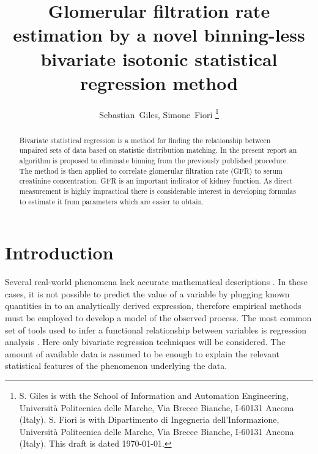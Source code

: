 \documentclass[10pt,final]{siamltex}
\begin{document}
\title{Glomerular filtration rate estimation by a novel binning-less bivariate isotonic statistical regression method}
\author{Sebastian~Giles, Simone~Fiori%
\thanks{S. Giles is with the School of Information and Automation Engineering,
Universit\`{a} Politecnica delle Marche,
Via Brecce Bianche, I-60131 Ancona (Italy).
\newline\indent
S. Fiori is with Dipartimento di Ingegneria dell'Informazione,
Universit\`{a} Politecnica delle Marche,
Via Brecce Bianche, I-60131 Ancona (Italy).
\newline\indent
This draft is dated \today.}}
\maketitle
\def\bbbr{\mathbb{R}}
\def\bbbx{\mathbb{X}}
\def\bbby{\mathbb{Y}}
\def\mdef{{\stackrel{{\mathrm{def}}}{=}}}
\renewcommand*{\thefootnote}{\fnsymbol{footnote}}
\def\to{\mathbf{\ to\ }}
\setcounter{footnote}{1}
%
%
\begin{abstract}
  Bivariate statistical regression is a method for finding the relationship between unpaired sets of data based on statistic distribution matching. In the present report an  algorithm is proposed to eliminate binning from the previously published procedure. The method is then applied to correlate glomerular filtration rate (GFR) to serum creatinine concentration. GFR is an important indicator of kidney function. As direct measurement is highly impractical there is considerable interest in developing formulas to estimate it from parameters which are easier to obtain.
\end{abstract}
%
\section{Introduction}\label{intro}
Several real-world phenomena lack accurate mathematical descriptions \cite{strontium, seismic}. In these cases, it is not possible to predict the value of a variable by plugging known quantities in to an analytically derived expression, therefore empirical methods must be employed to develop a model of the observed process. The most common set of tools used to infer a functional relationship between variables is regression analysis \cite{control, ts}. Here only bivariate regression techniques will be considered. The amount of available data is assumed to be enough to explain the relevant statistical features of the phenomenon underlying the data.
\end{document}
